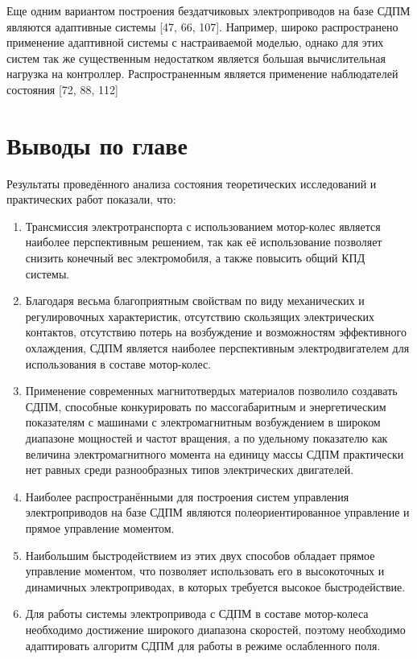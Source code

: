 Еще одним вариантом построения бездатчиковых электроприводов на базе СДПМ являются адаптивные системы [47, 66, 107]. Например, широко распространено применение адаптивной системы с настраиваемой моделью, однако для этих систем так же существенным недостатком является большая вычислительная нагрузка на контроллер. 
Распространенным является применение наблюдателей состояния [72, 88, 112]


\section{Выводы по главе} \label{sec:ch1/sec5}

 Результаты проведённого анализа состояния теоретических исследований и практических работ показали, что:
\begin{enumerate}
\item Трансмиссия электротранспорта с использованием мотор-колес является наиболее перспективным решением, так как её использование позволяет снизить конечный вес электромобиля, а также повысить общий КПД системы. 
\item Благодаря весьма благоприятным свойствам по виду механических и регулировочных характеристик, отсутствию скользящих электрических контактов, отсутствию потерь на возбуждение и возможностям эффективного охлаждения, СДПМ является наиболее перспективным электродвигателем для использования в составе мотор-колес.
\item Применение современных магнитотвердых материалов позволило создавать СДПМ, способные конкурировать по массогабаритным и энергетическим показателям с машинами с электромагнитным возбуждением в широком диапазоне мощностей и частот вращения, а по удельному показателю как величина электромагнитного момента на единицу массы СДПМ практически нет равных среди разнообразных типов электрических двигателей.
\item Наиболее распространёнными для построения систем управления электроприводов на базе СДПМ являются полеориентированное управление и прямое управление моментом.
\item Наибольшим быстродействием из этих двух способов обладает прямое управление моментом, что позволяет использовать его в высокоточных и динамичных электроприводах, в которых требуется высокое быстродействие.
\item Для работы системы электропривода с СДПМ в составе мотор-колеса необходимо достижение широкого диапазона скоростей, поэтому необходимо адаптировать алгоритм СДПМ для работы в режиме ослабленного поля.
\end{enumerate}
